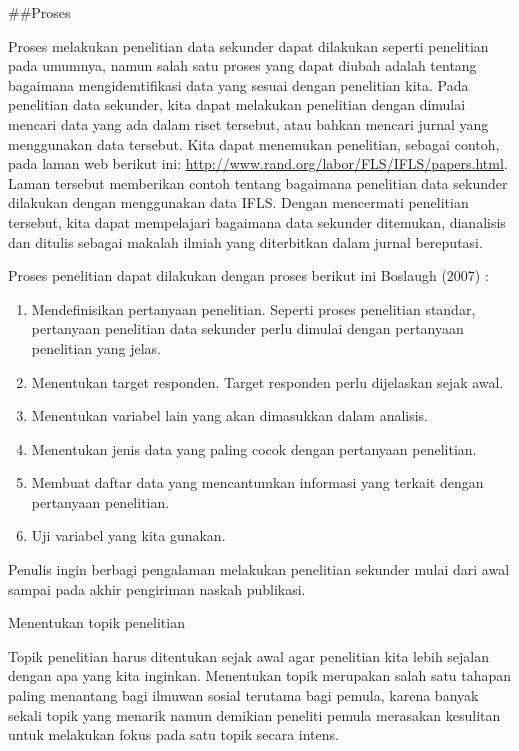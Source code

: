 \documentclass[
]{book}
\begin{document}
\#\#Proses

Proses melakukan penelitian data sekunder dapat dilakukan seperti penelitian pada umumnya, namun salah satu proses yang dapat diubah adalah tentang bagaimana mengidemtifikasi data yang sesuai dengan penelitian kita. Pada penelitian data sekunder, kita dapat melakukan penelitian dengan dimulai mencari data yang ada dalam riset tersebut, atau bahkan mencari jurnal yang menggunakan data tersebut. Kita dapat menemukan penelitian, sebagai contoh, pada laman web berikut ini: \url{http://www.rand.org/labor/FLS/IFLS/papers.html}. Laman tersebut memberikan contoh tentang bagaimana penelitian data sekunder dilakukan dengan menggunakan data IFLS. Dengan mencermati penelitian tersebut, kita dapat mempelajari bagaimana data sekunder ditemukan, dianalisis dan ditulis sebagai makalah ilmiah yang diterbitkan dalam jurnal bereputasi.

Proses penelitian dapat dilakukan dengan proses berikut ini Boslaugh (2007) :

\begin{enumerate}
\def\labelenumi{\arabic{enumi}.}
\item
  Mendefinisikan pertanyaan penelitian. Seperti proses penelitian standar, pertanyaan penelitian data sekunder perlu dimulai dengan pertanyaan penelitian yang jelas.
\item
  Menentukan target responden. Target responden perlu dijelaskan sejak awal.
\item
  Menentukan variabel lain yang akan dimasukkan dalam analisis.
\item
  Menentukan jenis data yang paling cocok dengan pertanyaan penelitian.
\item
  Membuat daftar data yang mencantumkan informasi yang terkait dengan pertanyaan penelitian.
\item
  Uji variabel yang kita gunakan.
\end{enumerate}

Penulis ingin berbagi pengalaman melakukan penelitian sekunder mulai dari awal sampai pada akhir pengiriman naskah publikasi.

Menentukan topik penelitian

Topik penelitian harus ditentukan sejak awal agar penelitian kita lebih sejalan dengan apa yang kita inginkan. Menentukan topik merupakan salah satu tahapan paling menantang bagi ilmuwan sosial terutama bagi pemula, karena banyak sekali topik yang menarik namun demikian peneliti pemula merasakan kesulitan untuk melakukan fokus pada satu topik secara intens.
\end{document}

